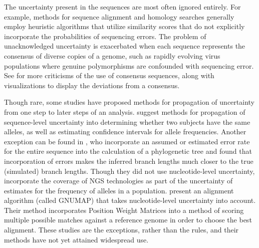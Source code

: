 \documentclass[12pt]{article}
\begin{document}
The uncertainty present in the sequences are most often ignored entirely.
For example, methods for sequence alignment and homology searches generally employ heuristic algorithms that utilize similarity scores that do not explicitly incorporate the probabilities of sequencing errors.
The problem of unacknowledged uncertainty is exacerbated when each sequence represents the consensus of diverse copies of a genome, such as rapidly evolving virus populations where genuine polymorphisms are confounded with sequencing error. 
See \cite{schneiderConsensusSequenceZen2002} for more criticisms of the use of consensus sequences, along with visualizations \cite[][called \emph{sequence logos}]{schneiderSequenceLogosNew1990} to display the deviations from a consensus.

Though rare, some studies have proposed methods for propagation of uncertainty from one step to later steps of an analysis.
\cite{oraweAccountingUncertaintyDNA2015} suggest methods for propagation of sequence-level uncertainty into determining whether two subjects have the same alleles, as well as estimating confidence intervals for allele frequencies. 
Another exception can be found in \cite{kuhnerCorrectingSequencingError2014}, who incorporate an assumed or estimated error rate for the entire sequence into the calculation of a phylogenetic tree and found that incorporation of errors makes the inferred branch lengths much closer to the true (simulated) branch lengths.
Though they did not use nucleotide-level uncertainty, \cite{gompertHierarchicalBayesianModel2011} incorporate the coverage of NGS technologies as part of the uncertainty of estimates for the frequency of alleles in a population.
\cite{clementGNUMAPAlgorithmUnbiased2010} present an alignment algorithm (called GNUMAP) that takes nucleotide-level uncertainty into account. 
Their method incorporates Position Weight Matrices into a method of scoring multiple possible matches against a reference genome in order to choose the best alignment. 
These studies are the exceptions, rather than the rules, and their methods have not yet attained widespread use.
\end{document}

